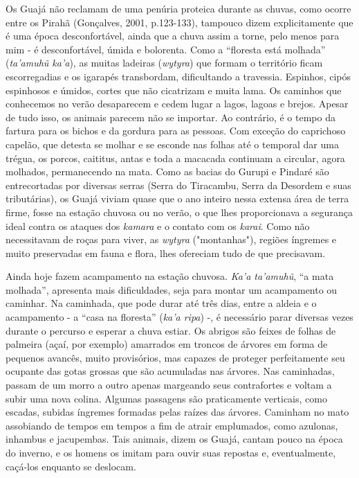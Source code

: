 Os Guajá não reclamam de uma penúria proteica durante as chuvas, como
ocorre entre os Pirahã (Gonçalves, 2001, p.123-133), tampouco dizem
explicitamente que é uma época desconfortável, ainda que a chuva assim a
torne, pelo menos para mim - é desconfortável, úmida e bolorenta. Como a
``floresta está molhada'' (\emph{ta'amuhũ ka'a}), as muitas ladeiras
(\emph{wytyra}) que formam o território ficam escorregadias e os
igarapés transbordam, dificultando a travessia. Espinhos, cipós
espinhosos e úmidos, cortes que não cicatrizam e muita lama. Os caminhos
que conhecemos no verão desaparecem e cedem lugar a lagos, lagoas e
brejos. Apesar de tudo isso, os animais parecem não se importar. Ao
contrário, é o tempo da fartura para os bichos e da gordura para as
pessoas. Com exceção do caprichoso capelão, que detesta se molhar e se
esconde nas folhas até o temporal dar uma trégua, os porcos, caititus,
antas e toda a macacada continuam a circular, agora molhados,
permanecendo na mata. Como as bacias do Gurupi e Pindaré são
entrecortadas por diversas serras (Serra do Tiracambu, Serra da Desordem
e suas tributárias), os Guajá viviam quase que o ano inteiro nessa
extensa área de terra firme, fosse na estação chuvosa ou no verão, o que
lhes proporcionava a segurança ideal contra os ataques dos \emph{kamara}
e o contato com os \emph{karai}. Como não necessitavam de roças para
viver, as \emph{wytyra} ("montanhas"), regiões íngremes e muito
preservadas em fauna e flora, lhes ofereciam tudo de que precisavam.

Ainda hoje fazem acampamento na estação chuvosa. \emph{Ka'a ta'amuhũ},
``a mata molhada'', apresenta mais dificuldades, seja para montar um
acampamento ou caminhar. Na caminhada, que pode durar até três dias,
entre a aldeia e o acampamento - a ``casa na floresta'' (\emph{ka'a
ripa}) -, é necessário parar diversas vezes durante o percurso e esperar
a chuva estiar. Os abrigos são feixes de folhas de palmeira (açaí, por
exemplo) amarrados em troncos de árvores em forma de pequenos avancês,
muito provisórios, mas capazes de proteger perfeitamente seu ocupante
das gotas grossas que são acumuladas nas árvores. Nas caminhadas, passam
de um morro a outro apenas margeando seus contrafortes e voltam a subir
uma nova colina. Algumas passagens são praticamente verticais, como
escadas, subidas íngremes formadas pelas raízes das árvores. Caminham no
mato assobiando de tempos em tempos a fim de atrair emplumados, como
azulonas, inhambus e jacupembas. Tais animais, dizem os Guajá, cantam
pouco na época do inverno, e os homens os imitam para ouvir suas
repostas e, eventualmente, caçá-los enquanto se deslocam.

